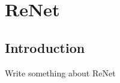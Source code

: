 \chapter{ReNet}\label{sec:renet}

\section{Introduction}\label{sec:i}
Write something about ReNet


